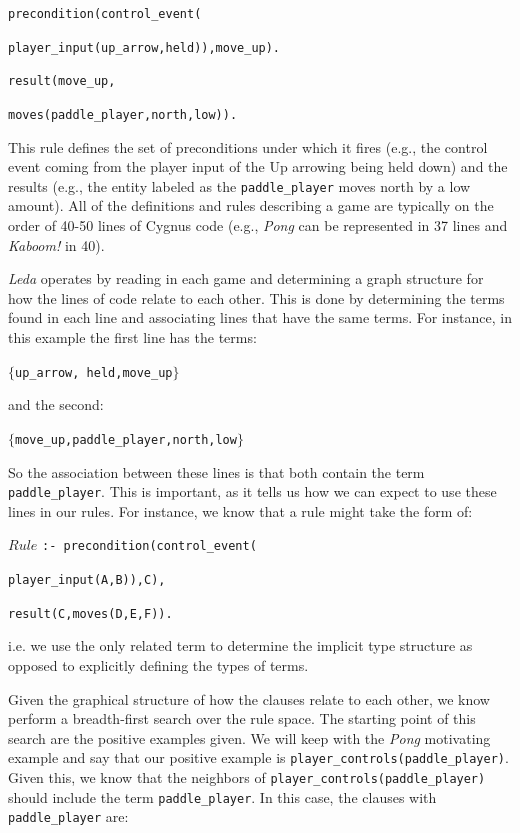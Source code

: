\documentclass[12pt]{report}
\begin{document}
\noindent \texttt{precondition(control\_event(}

\texttt{player\_input(up\_arrow,held)),move\_up).}

\noindent \texttt{result(move\_up,}

\texttt{moves(paddle\_player,north,low)).}

\noindent This rule defines the set of preconditions under which it fires (e.g., the control event coming from the player input of the Up arrowing being held down) and the results (e.g., the entity labeled as the \texttt{paddle\_player} moves north by a low amount). All of the definitions and rules describing a game are typically on the order of 40-50 lines of Cygnus code (e.g., \textit{Pong} can be represented in 37 lines and \textit{Kaboom!} in 40). 

\textit{Leda} operates by reading in each game and determining a graph structure for how the lines of code relate to each other. This is done by determining the terms found in each line and associating lines that have the same terms. For instance, in this example the first line has the terms:

$\{$\texttt{up\_arrow, held,move\_up}$\}$

\noindent and the second:

$\{$\texttt{move\_up,paddle\_player,north,low}$\}$

So the association between these lines is that both contain the term \texttt{paddle\_player}. This is important, as it tells us how we can expect to use these lines in our rules. For instance, we know that a rule might take the form of:

\noindent $Rule$ \texttt{:- precondition(control\_event(} 

\hspace{3cm} \texttt{player\_input(A,B)),C),}

\hspace{1cm} \texttt{result(C,moves(D,E,F)).}

i.e. we use the only related term to determine the implicit type structure as opposed to explicitly defining the types of terms. 

Given the graphical structure of how the clauses relate to each other, we know perform a breadth-first search over the rule space. The starting point of this search are the positive examples given. We will keep with the \textit{Pong} motivating example and say that our positive example is \texttt{player\_controls(paddle\_player)}. Given this, we know that the neighbors of \texttt{player\_controls(paddle\_player)} should include the term \texttt{paddle\_player}. In this case, the clauses with \texttt{paddle\_player} are:
\end{document}
